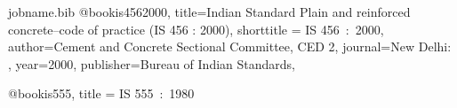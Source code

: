 \RequirePackage{filecontents}
\begin{filecontents*}{jobname.bib}
@book{is4562000,
 title={Indian Standard Plain and reinforced concrete--code of
         practice (IS 456 : 2000)},
 shorttitle = {IS 456~:~2000},
 author={{Cement and Concrete Sectional Committee, CED 2}},
 journal={New Delhi: },
 year={2000},
 publisher={Bureau of Indian Standards},	
 }
 	

@book{is555,
     title = {IS 555~:~1980}
     }
\end{filecontents*}

\documentclass[a4paper,10pt]{article}



\usepackage[backend=biber,
  style=ieee]{biblatex}
		






	



This is bibliography using biblatex \cite{is4562000}.

.	

\citeyear{is4562000}.

\citeauthor{is4562000}.

\printbibliography

	


